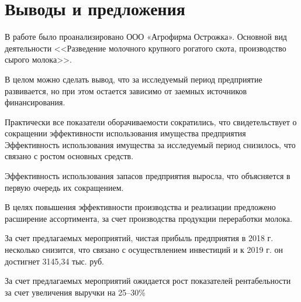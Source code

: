 \section*{Выводы и предложения}

В работе было проанализировано ООО «Агрофирма Острожка». Основной вид деятельности <<Разведение молочного крупного рогатого скота, производство сырого молока>>.

В целом можно сделать вывод, что за исследуемый период предприятие развивается, но при этом остается зависимо от заемных источников финансирования. 

Практически все показатели оборачиваемости сократились, что свидетельствует о сокращении эффективности использования имущества предприятия Эффективность использования имущества за исследуемый период снизилось, что связано с ростом основных средств. 

Эффективность использования запасов предприятия выросла, что объясняется в первую очередь их сокращением. 

В целях повышения эффективности производства и реализации предложено расширение ассортимента, за счет производства продукции переработки молока.

За счет предлагаемых мероприятий, чистая прибыль предприятия в 2018 г. несколько снизится, что связано с осуществлением инвестиций и к 2019 г. он достигнет 3145,34 тыс. руб. 

За счет предлагаемых мероприятий ожидается рост показателей рентабельности за счет увеличения выручки на 25--30\%
